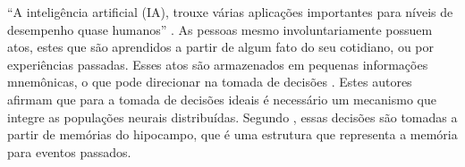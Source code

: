 “A inteligência artificial (IA), trouxe várias aplicações importantes para níveis de desempenho quase humanos” \cite{anthes}.
As pessoas mesmo involuntariamente possuem atos, estes que são aprendidos a partir de algum fato do seu cotidiano, ou por experiências passadas. Esses atos são armazenados em pequenas informações mnemônicas, o que pode direcionar na tomada de decisões \cite{buzsaki}. Estes autores afirmam que para a tomada de decisões ideais é necessário um mecanismo que integre  as populações neurais distribuídas. Segundo \cite{eichenbaum}, essas decisões são tomadas a partir de memórias do hipocampo, que é uma estrutura que representa a memória para eventos passados.

